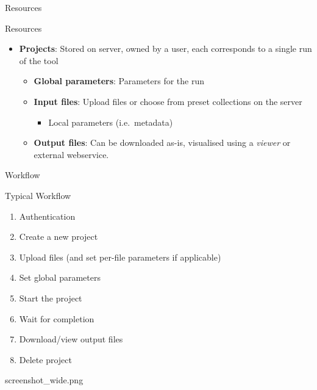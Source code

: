 \documentclass[xcolor=table,10pt,t]{beamer}
\begin{document}
\begin{frame}{Resources}
  \begin{block}{Resources}
      \begin{itemize}
          \item \textbf{Projects}: Stored on server, owned by a user, each corresponds to a single
              run of the tool
          \begin{itemize}
            \item \textbf{Global parameters}: Parameters for the run
            \item \textbf{Input files}: Upload files or choose from preset collections on the server
            \begin{itemize}
                \item Local parameters (i.e.\ metadata)
            \end{itemize}
            \item \textbf{Output files}: Can be downloaded as-is, visualised
                using a \emph{viewer} or external webservice.
          \end{itemize}
      \end{itemize}
  \end{block}
\end{frame}


\begin{frame}{Workflow}
  \begin{block}{Typical Workflow}
      \begin{enumerate}
        \item Authentication
        \item Create a new project
        \item Upload files (and set per-file parameters if applicable)
        \item Set global parameters
        \item Start the project
        \item Wait for completion
        \item Download/view output files
        \item Delete project
      \end{enumerate}
  \end{block}
\end{frame}


\begin{tussenpagina}{}{}{screenshot_wide.png}
\end{tussenpagina}
\end{document}
